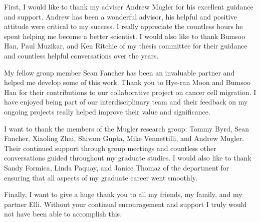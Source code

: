 %
%
%
%


\begin{acknowledgments}
  First, I would like to thank my adviser Andrew Mugler for his excellent guidance and support.
  Andrew has been a wonderful advisor, his helpful and positive attitude were critical to my success. I really appreciate the countless hours he spent helping me become a better scientist.
  I would also like to thank Bumsoo Han, Paul Muzikar, and Ken Ritchie of my thesis committee for their guidance and countless helpful conversations over the years.

  My fellow group member Sean Fancher has been an invaluable partner and helped me develop some of this work. Thank you to Hye-ran Moon and Bumsoo Han for their contributions to our collaborative project on cancer cell migration. I have enjoyed being part of our interdisciplinary team and their feedback on my ongoing projects really helped improve their value and significance.

  I want to thank the members of the Mugler research group: Tommy Byrd, Sean Fancher, Xiaoling Zhai, Shivam Gupta, Mike Vennettilli, and Andrew Mugler. Their continued support through group meetings and countless other conversations guided throughout my graduate studies.
  I would also like to thank Sandy Formica, Linda Paquay, and Janice Thomaz of the department for ensuring that all aspects of my graduate career went smoothly.

  Finally, I want to give a huge thank you to all my friends, my family, and my partner Elli. Without your continual encouragement and support I truly would not have been able to accomplish this.
\end{acknowledgments}


